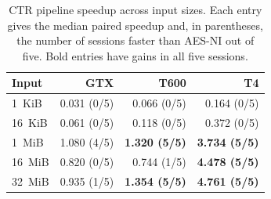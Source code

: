 \begin{table}[htbp]
  \centering
  \small
  \caption{CTR pipeline speedup across input sizes. Each entry gives the median
  paired speedup and, in parentheses, the number of sessions faster than AES-NI out
  of five. Bold entries have gains in all five sessions.}
  \label{tab:ctr-size-results}
  \begin{tabular}{lrrr}
    \toprule
    Input & GTX & T600 & T4 \\
    \midrule
    1~KiB & 0.031 (0/5) & 0.066 (0/5) & 0.164 (0/5) \\
    16~KiB & 0.061 (0/5) & 0.118 (0/5) & 0.372 (0/5) \\
    1~MiB & 1.080 (4/5) & \textbf{1.320 (5/5)} & \textbf{3.734 (5/5)} \\
    16~MiB & 0.820 (0/5) & 0.744 (1/5) & \textbf{4.478 (5/5)} \\
    32~MiB & 0.935 (1/5) & \textbf{1.354 (5/5)} & \textbf{4.761 (5/5)} \\
    \bottomrule
  \end{tabular}
\end{table}
